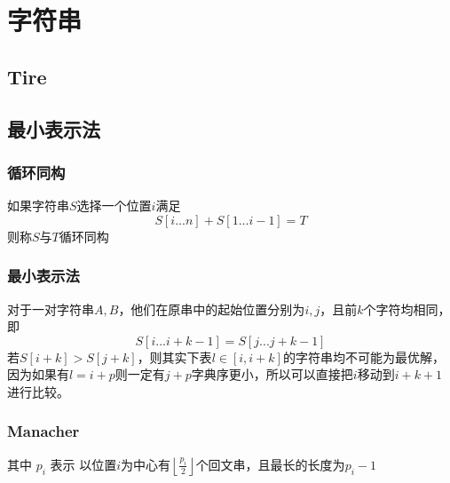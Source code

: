 \chapter{字符串}






\section{Tire}




\section{最小表示法}

\subsection{循环同构}
如果字符串$S$选择一个位置$i$满足
$$
S[i...n]+S[1...i-1] = T
$$
则称$S$与$T$循环同构

\subsection{最小表示法}
对于一对字符串$A,B$，他们在原串中的起始位置分别为$i,j$，且前$k$个字符均相同，即
$$
S[i...i+k-1] =S[j...j+k-1]
$$
若$S[i+k]>S[j+k]$，则其实下表$l\in[i,i+k]$的字符串均不可能为最优解，因为如果有$l=i+p$则一定有$j+p$字典序更小，所以可以直接把$i$移动到$i+k+1$进行比较。



\subsection{Manacher}

其中 $p_i$ 表示 以位置$i$为中心有$\left \lfloor \frac{p_i}{2} \right \rfloor $个回文串，且最长的长度为$p_i-1$